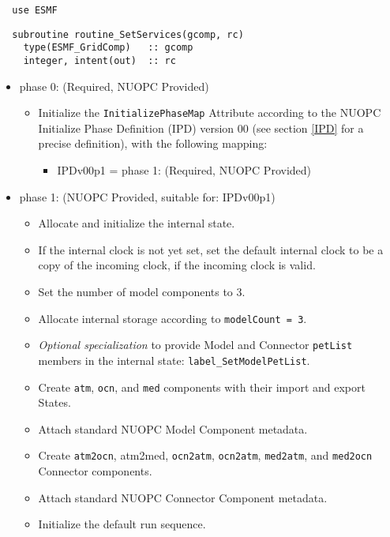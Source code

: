 \begin{verbatim}  use ESMF
\end{verbatim}

\begin{verbatim}  subroutine routine_SetServices(gcomp, rc)
    type(ESMF_GridComp)   :: gcomp
    integer, intent(out)  :: rc
\end{verbatim}

\begin{itemize}
\item phase 0: ({\sc Required, NUOPC Provided})
  \begin{itemize}
  \item Initialize the {\tt InitializePhaseMap} Attribute according to the NUOPC Initialize Phase Definition (IPD) version 00 (see section \ref{IPD} for a precise definition), with the following mapping:
    \begin{itemize}
    \item IPDv00p1 = phase 1: ({\sc Required, NUOPC Provided})
    \end{itemize}  
  \end{itemize}  
\item phase 1: ({\sc NUOPC Provided}, suitable for: IPDv00p1)
  \begin{itemize}
  \item Allocate and initialize the internal state.
  \item If the internal clock is not yet set, set the default internal clock to be a copy of the incoming clock, if the incoming clock is valid.
  \item Set the number of model components to 3.
  \item Allocate internal storage according to {\tt modelCount = 3}.
  \item {\it Optional specialization} to provide Model and Connector {\tt petList} members in the internal state: {\tt label\_SetModelPetList}.
  \item Create {\tt atm}, {\tt ocn}, and {\tt med} components with their import and export States.
  \item Attach standard NUOPC Model Component metadata.
  \item Create {\tt atm2ocn}, {atm2med}, {\tt ocn2atm}, {\tt ocn2atm}, {\tt med2atm}, and {\tt med2ocn} Connector components.
  \item Attach standard NUOPC Connector Component metadata.
  \item Initialize the default run sequence.

\end{itemize}
\end{itemize}
